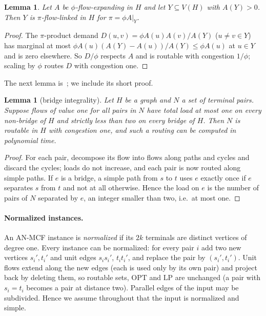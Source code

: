 \documentclass[11pt,letterpaper]{article}
\newtheorem{lemma}[theorem]{Lemma}
\theoremstyle{definition}
\newcommand{\LP}{\mathrm{LP}}
\newcommand{\OPT}{\mathrm{OPT}}
\begin{document}
\begin{lemma}\label{lem:monotone}
Let $A$ be $\phi$-flow-expanding in $H$ and let $Y\subseteq V(H)$ with $A(Y)>0$. Then $Y$ is
$\pi$-flow-linked in $H$ for $\pi=\phi A|_Y$.
\end{lemma}
\begin{proof}
The $\pi$-product demand $D(u,v)=\phi A(u)A(v)/A(Y)$ ($u\ne v\in Y$) has marginal at most
$\phi A(u)(A(Y)-A(u))/A(Y)\le\phi A(u)$ at $u\in Y$ and is zero elsewhere. So $D/\phi$ respects
$A$ and is routable with congestion $1/\phi$; scaling by $\phi$ routes $D$ with congestion
one.
\end{proof}

The next lemma is~\cite[Lemma~3.10]{CKS13}; we include its short proof.

\begin{lemma}[bridge integrality]\label{lem:bridge}
Let $H$ be a graph and $N$ a set of terminal pairs. Suppose flows of value one for all pairs
in $N$ have total load at most one on every non-bridge of $H$ and strictly less than two on
every bridge of $H$. Then $N$ is routable in $H$ with congestion one, and such a routing can
be computed in polynomial time.
\end{lemma}
\begin{proof}
For each pair, decompose its flow into flows along paths and cycles and discard the cycles;
loads do not increase, and each pair is now routed along simple paths. If $e$ is a bridge,
a simple path from $s$ to $t$ uses $e$ exactly once if $e$ separates $s$ from $t$ and not at
all otherwise. Hence the load on $e$ is the number of pairs of $N$ separated by $e$, an
integer smaller than two, i.e.\ at most one.
\end{proof}

\paragraph{Normalized instances.}
An AN-MCF instance is \emph{normalized} if its $2k$ terminals are distinct vertices of degree
one. Every instance can be normalized: for every pair $i$ add two new vertices $s_i',t_i'$ and
unit edges $s_is_i'$, $t_it_i'$, and replace the pair by $(s_i',t_i')$. Unit flows extend
along the new edges (each is used only by its own pair) and project back by deleting them,
so routable sets, $\OPT$ and $\LP$ are unchanged (a pair with $s_i=t_i$ becomes a pair at
distance two). Parallel edges of the input may be subdivided. Hence we assume throughout that
the input is normalized and simple.
\end{document}
